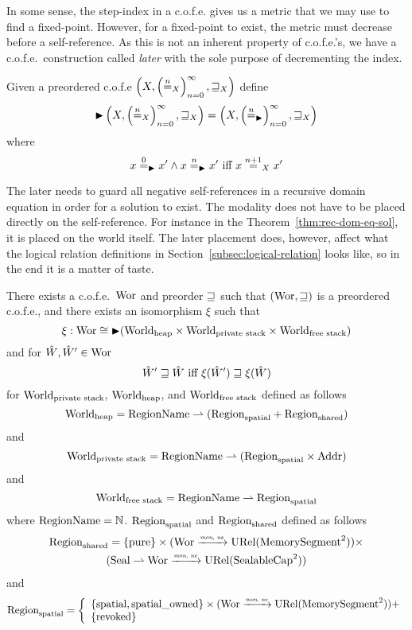 \begin{jversion}

In some sense, the step-index in a c.o.f.e. gives us a metric that we may use to find a fixed-point.
However, for a fixed-point to exist, the metric must decrease before a self-reference.
As this is not an inherent property of c.o.f.e.'s, we have a c.o.f.e.\ construction called \emph{later} with the sole purpose of decrementing the index.
\begin{lemma}
  Given a preordered c.o.f.e $\left(X, \left(\nequal_X\right)_{n=0}^{\infty}, \future_X \right)$ define
  \[
    \blater\left(X, \left(\nequal_X\right)_{n=0}^{\infty}, \future_X \right) = \left(X, \left(\nequal[n]_{\blater}\right)_{n=0}^{\infty}, \future_X \right)
  \]
  where
  \[
    x \nequal[0]_{\blater} x' \wedge x \nequal[n]_{\blater} x' \text{ iff } x \nequal[n+1]_X x'
  \]
\end{lemma}
The later needs to guard all negative self-references in a recursive domain equation in order for a solution to exist.
The modality does not have to be placed directly on the self-reference.
For instance in the Theorem~\ref{thm:rec-dom-eq-sol}, it is placed on the world itself.
The later placement does, however, affect what the logical relation definitions in Section~\ref{subsec:logical-relation} looks like, so in the end it is a matter of taste.
\begin{theorem}
  \label{thm:rec-dom-eq-sol}
  There exists a c.o.f.e.\ $\Wor$ and preorder $\future$ such that $(\Wor,\future)$ is a preordered c.o.f.e., and there exists an isomorphism $\xi$ such that
  \[
    \xi : \Wor \cong \blater (\Worldh \times \Worlds \times \Worldfs)
  \]
  and for $\hat{W},\hat{W}' \in \Wor$
  \[
    \hat{W}' \future \hat{W} \text{ iff } \xi(\hat{W}') \future \xi(\hat{W})
  \]
  for $\Worlds$, $\Worldh$, and $\Worldfs$ defined as follows
\[
  \Worldh = \RegionName \parfun (\Regions + \Regionh)
\]
and
\[
  \Worlds = \RegionName \parfun (\Regions \times \Addr)
\]
and
\[
  \Worldfs = \RegionName \parfun \Regions
\]
where $\RegionName = \nats$. $\Regions$ and $\Regionh$ defined as follows
\begin{multline*}
  \Regionh = 
  \{\pure \} \times (\Wor \monnefun \URel{\MemSeg^2}) \times \\
  (\Seal \parfun \Wor \monnefun \URel{\SealableCaps^2})
\end{multline*}
and
\[
  \Regions = \left\{
  \begin{array}{l}
    \{\spatial, \spatialo\} \times (\Wor \monnefun \URel{\MemSeg^2}) +\\
    \{\revoked\}
  \end{array} \right.
\]
\end{theorem}


\end{jversion}
